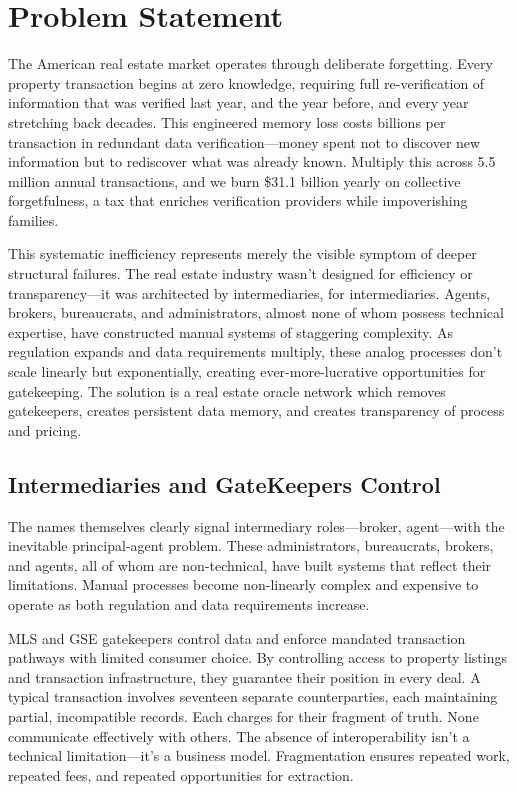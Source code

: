 \chapter{Problem Statement}

The American real estate market operates through deliberate forgetting. Every property transaction begins at zero knowledge, requiring full re-verification of information that was verified last year, and the year before, and every year stretching back decades. This engineered memory loss costs billions per transaction in redundant data verification—money spent not to discover new information but to rediscover what was already known. Multiply this across 5.5 million annual transactions, and we burn \$31.1 billion yearly on collective forgetfulness, a tax that enriches verification providers while impoverishing families.

This systematic inefficiency represents merely the visible symptom of deeper structural failures. The real estate industry wasn't designed for efficiency or transparency—it was architected by intermediaries, for intermediaries. Agents, brokers, bureaucrats, and administrators, almost none of whom possess technical expertise, have constructed manual systems of staggering complexity. As regulation expands and data requirements multiply, these analog processes don't scale linearly but exponentially, creating ever-more-lucrative opportunities for gatekeeping. The solution is a real estate oracle network which removes gatekeepers, creates persistent data memory, and creates transparency of process and pricing.

\section{Intermediaries and GateKeepers Control}

The names themselves clearly signal intermediary roles—broker, agent—with the inevitable principal-agent problem. These administrators, bureaucrats, brokers, and agents, all of whom are non-technical, have built systems that reflect their limitations. Manual processes become non-linearly complex and expensive to operate as both regulation and data requirements increase.

MLS and GSE gatekeepers control data and enforce mandated transaction pathways with limited consumer choice. By controlling access to property listings and transaction infrastructure, they guarantee their position in every deal. A typical transaction involves seventeen separate counterparties, each maintaining partial, incompatible records. Each charges for their fragment of truth. None communicate effectively with others. The absence of interoperability isn't a technical limitation—it's a business model. Fragmentation ensures repeated work, repeated fees, and repeated opportunities for extraction.

